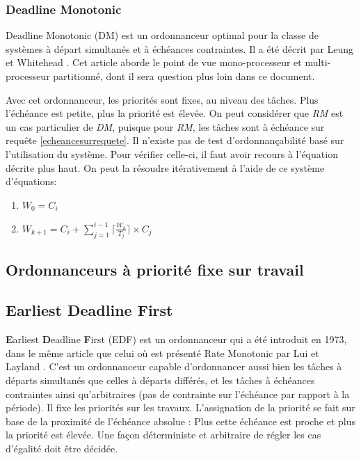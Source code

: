 \documentclass[11pt,a4paper,oneside]{report}
\newcommand{\customhighlight}[1]{{\textbf{#1}}}
\begin{document}
	
	\subsubsection{Deadline Monotonic}
	Deadline Monotonic (DM) est un ordonnanceur optimal pour la classe de systèmes à départ 
	simultanés et à échéances contraintes. 
	Il a été décrit par Leung et Whitehead 
	\cite{leung_complexity_1982}. Cet article aborde le point de vue mono-processeur et multi-processeur partitionné, 
	dont il sera question plus loin dans ce document.\medskip
	
	Avec cet ordonnanceur, les priorités sont fixes, au niveau des tâches.
	Plus l'échéance est petite, plus la priorité est élevée. On peut considérer que \textit{RM} est 
	un cas particulier de \textit{DM}, puisque pour \textit{RM}, les tâches sont à échéance sur requête \ref{echeancesurrequete}.
	Il n'existe pas de test d'ordonnançabilité basé sur l'utilisation du système. Pour vérifier celle-ci, 
	il faut avoir recours à l'équation décrite plus haut. 
	On peut la résoudre itérativement à l'aide de ce système d'équations: \medskip
	\begin{enumerate}
		\item $W_0 = C_i $
		\item $W_{k+1} = C_i + \sum_{j = 1}^{i-1}\lceil \frac{W_k}{T_j} \rceil \times C_j $
	\end{enumerate}
	
	
	\subsection{Ordonnanceurs à priorité fixe sur travail}
	\subsection{Earliest Deadline First}
	\customhighlight{E}arliest \customhighlight{D}eadline \customhighlight{F}irst (EDF) est un ordonnanceur 
	qui a été introduit en 1973, dans le même article que celui où est présenté Rate Monotonic 
	par Lui et Layland \cite{liu_scheduling_1973}. 
	C'est un ordonnanceur capable d'ordonnancer aussi bien les tâches à départs simultanés que celles 
	à départs différés, et les tâches à échéances contraintes ainsi 
	qu'arbitraires (pas de contrainte sur l'échéance par rapport à la période). 
	Il fixe les priorités sur les travaux. L'assignation de la priorité se fait sur base de 
	la proximité de l'échéance absolue : Plus cette échéance est proche et plus la priorité est élevée. 
	Une façon déterministe et arbitraire de régler les cas d'égalité doit être décidée.\medskip
	
\end{document}
